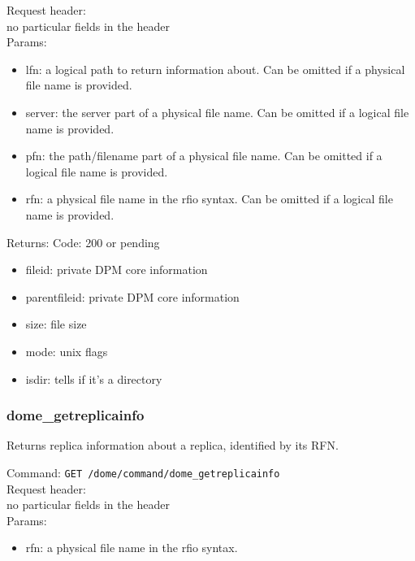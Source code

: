 \documentclass[a4paper,10pt]{scrreprt}
\begin{document}
Request header:\\
no particular fields in the header\\

Params:
\begin{itemize}
 \item lfn: a logical path to return information about. Can be omitted if a physical file name is provided.
 \item server: the server part of a physical file name. Can be omitted if a logical file name is provided.
 \item pfn: the path/filename part of a physical file name. Can be omitted if a logical file name is provided.
 \item rfn: a physical file name in the rfio syntax. Can be omitted if a logical file name is provided.
\end{itemize}

Returns:
Code: 200 or pending
\begin{itemize}
 \item fileid: private DPM core information
 \item parentfileid: private DPM core information
 \item size: file size
 \item mode: unix flags
 \item isdir: tells if it's a directory
\end{itemize}



\subsubsection{dome\_getreplicainfo}
Returns replica information about a replica, identified by its RFN.

Command:
\lstinline"GET /dome/command/dome_getreplicainfo"\\

Request header:\\
no particular fields in the header\\

Params:
\begin{itemize}
 \item rfn: a physical file name in the rfio syntax.
\end{itemize}
\end{document}

